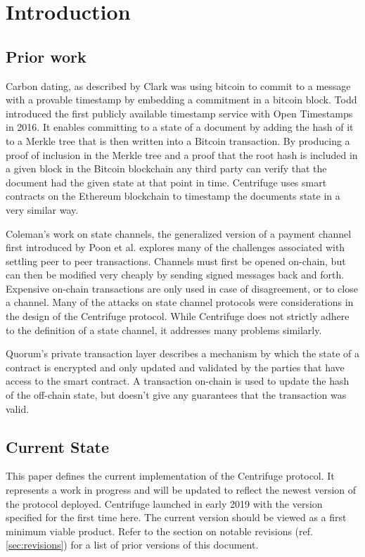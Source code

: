 \section{Introduction}
\subsection{Prior work}
Carbon dating, as described by Clark\cite{clark2012commitcoin} was using bitcoin to commit to a message with a provable timestamp by embedding a commitment in a bitcoin block. Todd\cite{todd2016opentimestamps} introduced the first publicly available timestamp service with Open Timestamps in 2016. It enables committing to a state of a document by adding the hash of it to a Merkle tree that is then written into a Bitcoin transaction. By producing a proof of inclusion in the Merkle tree and a proof that the root hash is included in a given block in the Bitcoin blockchain any third party can verify that the document had the given state at that point in time. Centrifuge uses smart contracts on the Ethereum blockchain to timestamp the documents state in a very similar way.

Coleman's work on state channels\cite{coleman2018counterfactual}, the generalized version of a payment channel first introduced by Poon et al.\cite{poon2016lightningnetwork} explores many of the challenges associated with settling peer to peer transactions. Channels must first be opened on-chain, but can then be modified very cheaply by sending signed messages back and forth. Expensive on-chain transactions are only used in case of disagreement, or to close a channel. Many of the attacks on state channel protocols were considerations in the design of the Centrifuge protocol. While Centrifuge does not strictly adhere to the definition of a state channel, it addresses many problems similarly.

Quorum's private transaction layer\cite{quorumprivatetransactionwiki} describes a mechanism by which the state of a contract is encrypted and only updated and validated by the parties that have access to the smart contract. A transaction on-chain is used to update the hash of the off-chain state, but doesn't give any guarantees that the transaction was valid.
\subsection{Current State}
This paper defines the current implementation of the Centrifuge protocol. It represents a work in progress and will be updated to reflect the newest version of the protocol deployed. Centrifuge launched in early 2019 with the version specified for the first time here. The current version should be viewed as a first minimum viable product. Refer to the section on notable revisions (ref. \ref{sec:revisions}) for a list of prior versions of this document.
